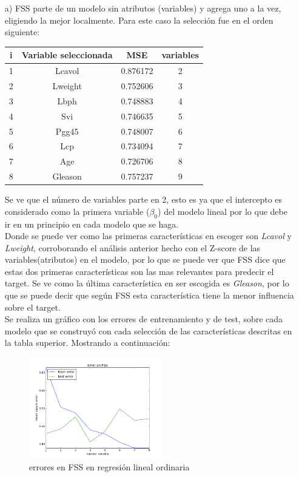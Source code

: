 \documentclass[10pt]{article}
\begin{document}
\begin{itemize}
\item[a)] FSS parte de un modelo sin atributos (variables) y agrega uno a la vez, eligiendo la mejor localmente. Para este caso la selección fue en el orden siguiente:


\begin{table}[!htb]
  \begin{center}
    \begin{tabular}{|c|c|c|c|} \hline
    i & Variable seleccionada & MSE & variables \\ \hline
    1 & Lcavol & 0.876172 &2 \\ 
    2 & Lweight & 0.752606 &3 \\ 
    3 & Lbph & 0.748883 &4 \\ 
    4 & Svi & 0.746635 &5 \\ 
    5 & Pgg45 & 0.748007 &6 \\ 
    6 & Lcp & 0.734094 &7 \\ 
    7 & Age & 0.726706 &8 \\
    8 & Gleason & 0.757237 &9 \\ \hline  
    \end{tabular}
  \end{center}
\end{table}

Se ve que el número de variables parte en 2, esto es ya que el intercepto es considerado como la primera variable ($\beta_0$) del modelo lineal por lo que debe ir en un principio en cada modelo que se haga.\\

Donde se puede ver como las primeras características en escoger son \textit{Lcavol} y \textit{Lweight}, corroborando el análisis anterior hecho con el Z-score de las variables(atributos) en el modelo, por lo que se puede ver que FSS dice que estas dos primeras características son las mas relevantes para predecir el target. Se ve como la última característica en ser escogida es \textit{Gleason}, por lo que se puede decir que según FSS esta característica tiene la menor influencia sobre el target.\\

Se realiza un gráfico con los errores de entrenamiento y de test, sobre cada modelo que se construyó con cada selección de las características descritas en la tabla superior. Mostrando a continuación:

\begin{figure}[h]
    \centering
    \includegraphics[width=0.55\textwidth]{images/fss}
    \caption{errores en FSS en regresión lineal ordinaria}
    \label{fig:mesh1}
\end{figure}


\end{itemize}
\end{document}
